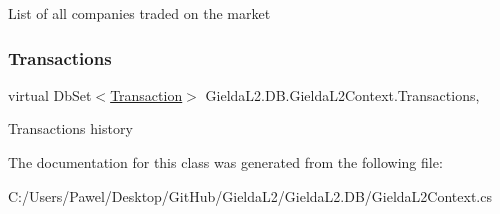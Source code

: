 List of all companies traded on the market 

\mbox{\label{class_gielda_l2_1_1_d_b_1_1_gielda_l2_context_a809df5e666f7fdb0cc6e53adad91efe8}} 
\subsubsection{\texorpdfstring{Transactions}{Transactions}}
{\footnotesize\ttfamily virtual Db\+Set$<$\mbox{\hyperlink{class_gielda_l2_1_1_d_b_1_1_entities_1_1_transaction}{Transaction}}$>$ Gielda\+L2.\+D\+B.\+Gielda\+L2\+Context.\+Transactions\hspace{0.3cm}{\ttfamily [get]}, {\ttfamily [set]}}



Transactions history 



The documentation for this class was generated from the following file\+:\begin{DoxyCompactItemize}
\item 
C\+:/\+Users/\+Pawel/\+Desktop/\+Git\+Hub/\+Gielda\+L2/\+Gielda\+L2.\+D\+B/Gielda\+L2\+Context.\+cs\end{DoxyCompactItemize}
